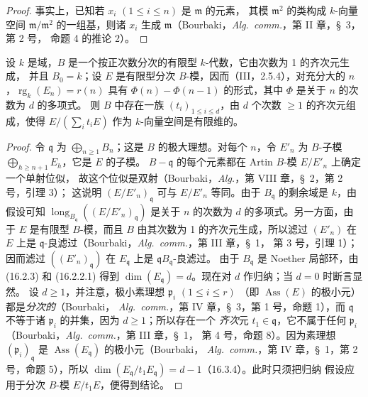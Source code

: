 \begin{proof}
事实上，已知若 $x_i$ $(1\leq i\leq n)$ 是 $\mathfrak{m}$ 的元素，
其模 $\mathfrak{m}^2$ 的类构成 $k$-向量空间
$\mathfrak{m}/\mathfrak{m}^2$ 的一组基，则诸 $x_i$ 生成
$\mathfrak{m}$（Bourbaki，\emph{Alg.~comm.}，第 II 章，\S~3，第 2 号，
命题 4 的推论 2）。
\end{proof}

\begin{proposition}[16.2.7]
\label{0.16.2.7-fr}
设 $k$ 是域，$B$ 是一个按正次数分次的有限型 $k$-代数，它由次数为 1 的齐次元生成，
并且 $B_0=k$；设 $E$ 是有限型分次 $B$-模，因而（III，2.5.4），对充分大的
$n$，$\operatorname{rg}_k(E_n)=r(n)$ 具有
$\Phi(n)-\Phi(n-1)$ 的形式，其中 $\Phi$ 是关于 $n$ 的次数为 $d$ 的多项式。
则 $B$ 中存在一族 $(t_i)_{1\leq i\leq d}$，由 $d$ 个次数
$\geq1$ 的齐次元组成，使得 $E/(\sum_i t_iE)$ 作为 $k$-向量空间是有限维的。
\end{proposition}

\begin{proof}
令 $\mathfrak{q}$ 为 $\bigoplus_{n\geq1}B_n$；这是 $B$ 的极大理想。对每个
$n$，令 $E'_n$ 为 $B$-子模 $\bigoplus_{h\geq n+1}E_h$，它是 $E$ 的子模。
$B-\mathfrak{q}$ 的每个元素都在 Artin $B$-模 $E/E'_n$ 上确定一个单射位似，
故这个位似是双射（Bourbaki，\emph{Alg.}，第 VIII 章，\S~2，第 2 号，引理 3）；
这说明 $(E/E'_n)_{\mathfrak{q}}$ 可与 $E/E'_n$ 等同。由于
$B_{\mathfrak{q}}$ 的剩余域是 $k$，由假设可知
$\operatorname{long}_{B_{\mathfrak{q}}}((E/E'_n)_{\mathfrak{q}})$ 是关于
$n$ 的次数为 $d$ 的多项式。另一方面，由于 $E$ 是有限型 $B$-模，而且
$B$ 由其次数为 1 的齐次元生成，所以滤过 $(E'_n)$ 在 $E$ 上是
$\mathfrak{q}$-良滤过（Bourbaki，\emph{Alg.~comm.}，第 III 章，\S~1，
第 3 号，引理 1）；因而滤过 $((E'_n)_{\mathfrak{q}})$ 在
$E_{\mathfrak{q}}$ 上是 $\mathfrak{q}B_{\mathfrak{q}}$-良滤过。
由于 $B_{\mathfrak{q}}$ 是 Noether 局部环，由 (16.2.3) 和 (16.2.2.1)
得到 $\dim(E_{\mathfrak{q}})=d$。现在对 $d$ 作归纳；当 $d=0$ 时断言显然。
设 $d\geq1$，并注意，极小素理想 $\mathfrak{p}_i$ $(1\leq i\leq r)$
（即 $\operatorname{Ass}(E)$ 的极小元）都是\emph{分次的}（Bourbaki，
\emph{Alg.~comm.}，第 IV 章，\S~3，第 1 号，命题 1），而
$\mathfrak{q}$ 不等于诸 $\mathfrak{p}_i$ 的并集，因为 $d\geq1$；所以存在一个
\emph{齐次}元 $t_1\in\mathfrak{q}$，它不属于任何 $\mathfrak{p}_i$
（Bourbaki，\emph{Alg.~comm.}，第 III 章，\S~1，
第 4 号，命题 8）。因为素理想 $(\mathfrak{p}_i)_{\mathfrak{q}}$ 是
$\operatorname{Ass}(E_{\mathfrak{q}})$ 的极小元（Bourbaki，
\emph{Alg.~comm.}，第 IV 章，\S~1，第 2 号，命题 5），所以
$\dim(E_{\mathfrak{q}}/t_1E_{\mathfrak{q}})=d-1$（16.3.4）。此时只须把归纳
假设应用于分次 $B$-模 $E/t_1E$，便得到结论。
\end{proof}

